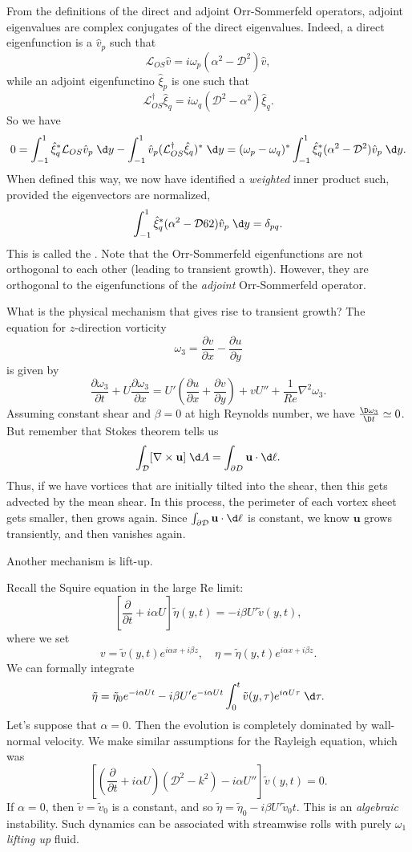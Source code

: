 \documentclass[a4paper]{article}
\begin{document}
From the definitions of the direct and adjoint Orr-Sommerfeld operators, adjoint eigenvalues are complex conjugates of the direct eigenvalues. Indeed, a direct eigenfunction is a $\hat{v}_p$ such that
\[
  \mathcal{L}_{OS} \hat{v} = i\omega_p (\alpha^2 - \mathcal{D}^2) \hat{v},
\]
while an adjoint eigenfunctino $\hat{\xi}_p$ is one such that
\[
  \mathcal{L}_{OS}^\dagger \hat{\xi}_q = i\omega_q (\mathcal{D}^2 - \alpha^2) \hat{\xi}_q.
\]
So we have
\[
  0 = \int_{-1}^1 \hat{\xi}_q^* \mathcal{L}_{OS} \hat{v}_p\;\d y  - \int_{-1}^1 \hat{v}_p (\mathcal{L}_{OS}^\dagger \hat{\xi}_q)^* \;\d y = (\omega_p - \omega_q)^* \int_{-1}^1 \hat{\xi}_q^* (\alpha^2 - \mathcal{D}^2) \hat{v}_p \;\d y.
\]
When defined this way, we now have identified a \emph{weighted} inner product such, provided the eigenvectors are normalized,
\[
  \int_{-1}^1 \hat{\xi}_q^*( \alpha^2 - \mathcal{D}62) \hat{v}_p \;\d y = \delta_{pq}.
\]
This is called the . Note that the Orr-Sommerfeld eigenfunctions are not orthogonal to each other (leading to transient growth). However, they are orthogonal to the eigenfunctions of the \emph{adjoint} Orr-Sommerfeld operator.

What is the physical mechanism that gives rise to transient growth? The equation for $z$-direction vorticity
\[
  \omega_3 = \frac{\partial v}{\partial x} - \frac{\partial u}{\partial y}
\]
is given by
\[
  \frac{\partial \omega_3}{\partial t} + U \frac{\partial \omega_3}{\partial x} = U' \left(\frac{\partial u}{\partial x} + \frac{\partial v}{\partial y}\right) + v U'' + \frac{1}{Re} \nabla^2 \omega_3.
\]
Assuming constant shear and $\beta = 0$ at high Reynolds number, we have $\frac{\D \omega_3}{\D t} \simeq 0$. But remember that Stokes theorem tells us
\[
  \int_\mathcal{D} [\nabla \times \mathbf{u}] \;\d A = \int_{\partial D} \mathbf{u} \cdot \d \ell.
\]
Thus, if we have vortices that are initially tilted into the shear, then this gets advected by the mean shear. In this process, the perimeter of each vortex sheet gets smaller, then grows again. Since $\int_{\partial \mathcal{D}} \mathbf{u} \cdot \d \ell$ is constant, we know $\mathbf{u}$ grows transiently, and then vanishes again.

Another mechanism is lift-up. 

Recall the Squire equation in the large Re limit:
\[
  \left[\frac{\partial}{\partial t} + i \alpha U \right] \tilde{\eta}(y, t) =  -i \beta U' \tilde{v}(y, t),
\]
where we set
\[
  v = \tilde{v}(y, t) e^{i\alpha x + i \beta z},\quad \eta = \tilde{\eta}(y, t) e^{i\alpha x + i \beta z}.
\]
We can formally integrate
\[
  \tilde{\eta} = \tilde{\eta}_0 e^{-i\alpha Ut} - i \beta U' e^{-i\alpha Ut} \int_0^t \tilde{v}(y, \tau)e^{i \alpha U\tau} \;\d \tau.
\]
Let's suppose that $\alpha = 0$. Then the evolution is completely dominated by wall-normal velocity. We make similar assumptions for the Rayleigh equation, which was
\[
  \left[\left(\frac{\partial}{\partial t} + i \alpha U\right) (\mathcal{D}^2 - k^2) - i \alpha U''\right] \tilde{v}(y, t) = 0.
\]
If $\alpha = 0$, then $\tilde{v} = \tilde{v}_0$ is a constant, and so $\tilde{\eta} = \tilde{\eta}_0 - i \beta U' \tilde{v}_0 t$. This is an \emph{algebraic} instability. Such dynamics can be associated with streamwise rolls with purely $\omega_1$ \emph{lifting up} fluid. 
\end{document}
